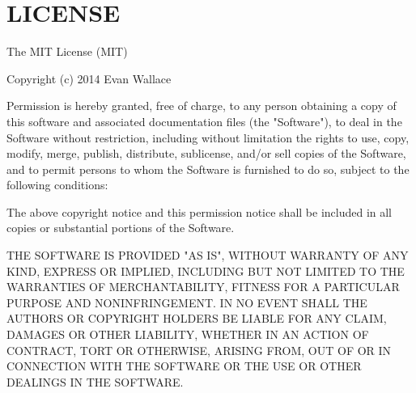 \chapter{LICENSE}
\hypertarget{md_pkiclassroomrescheduler_2src_2main_2frontend_2node__modules_2source-map-support_2_l_i_c_e_n_s_e}{}\label{md_pkiclassroomrescheduler_2src_2main_2frontend_2node__modules_2source-map-support_2_l_i_c_e_n_s_e}
The MIT License (MIT)

Copyright (c) 2014 Evan Wallace

Permission is hereby granted, free of charge, to any person obtaining a copy of this software and associated documentation files (the "{}\+Software"{}), to deal in the Software without restriction, including without limitation the rights to use, copy, modify, merge, publish, distribute, sublicense, and/or sell copies of the Software, and to permit persons to whom the Software is furnished to do so, subject to the following conditions\+:

The above copyright notice and this permission notice shall be included in all copies or substantial portions of the Software.

THE SOFTWARE IS PROVIDED "{}\+AS IS"{}, WITHOUT WARRANTY OF ANY KIND, EXPRESS OR IMPLIED, INCLUDING BUT NOT LIMITED TO THE WARRANTIES OF MERCHANTABILITY, FITNESS FOR A PARTICULAR PURPOSE AND NONINFRINGEMENT. IN NO EVENT SHALL THE AUTHORS OR COPYRIGHT HOLDERS BE LIABLE FOR ANY CLAIM, DAMAGES OR OTHER LIABILITY, WHETHER IN AN ACTION OF CONTRACT, TORT OR OTHERWISE, ARISING FROM, OUT OF OR IN CONNECTION WITH THE SOFTWARE OR THE USE OR OTHER DEALINGS IN THE SOFTWARE. 